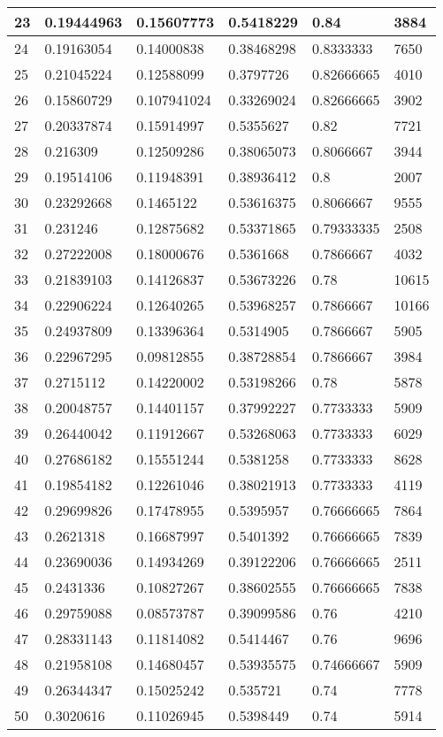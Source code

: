 \begin{longtable}{|l|l|l|l|l|l|}
23 & 0.19444963 & 0.15607773 & 0.5418229 & 0.84 & 3884 \\ \hline 
24 & 0.19163054 & 0.14000838 & 0.38468298 & 0.8333333 & 7650 \\ \hline 
25 & 0.21045224 & 0.12588099 & 0.3797726 & 0.82666665 & 4010 \\ \hline 
26 & 0.15860729 & 0.107941024 & 0.33269024 & 0.82666665 & 3902 \\ \hline 
27 & 0.20337874 & 0.15914997 & 0.5355627 & 0.82 & 7721 \\ \hline 
28 & 0.216309 & 0.12509286 & 0.38065073 & 0.8066667 & 3944 \\ \hline 
29 & 0.19514106 & 0.11948391 & 0.38936412 & 0.8 & 2007 \\ \hline 
30 & 0.23292668 & 0.1465122 & 0.53616375 & 0.8066667 & 9555 \\ \hline 
31 & 0.231246 & 0.12875682 & 0.53371865 & 0.79333335 & 2508 \\ \hline 
32 & 0.27222008 & 0.18000676 & 0.5361668 & 0.7866667 & 4032 \\ \hline 
33 & 0.21839103 & 0.14126837 & 0.53673226 & 0.78 & 10615 \\ \hline 
34 & 0.22906224 & 0.12640265 & 0.53968257 & 0.7866667 & 10166 \\ \hline 
35 & 0.24937809 & 0.13396364 & 0.5314905 & 0.7866667 & 5905 \\ \hline 
36 & 0.22967295 & 0.09812855 & 0.38728854 & 0.7866667 & 3984 \\ \hline 
37 & 0.2715112 & 0.14220002 & 0.53198266 & 0.78 & 5878 \\ \hline 
38 & 0.20048757 & 0.14401157 & 0.37992227 & 0.7733333 & 5909 \\ \hline 
39 & 0.26440042 & 0.11912667 & 0.53268063 & 0.7733333 & 6029 \\ \hline 
40 & 0.27686182 & 0.15551244 & 0.5381258 & 0.7733333 & 8628 \\ \hline 
41 & 0.19854182 & 0.12261046 & 0.38021913 & 0.7733333 & 4119 \\ \hline 
42 & 0.29699826 & 0.17478955 & 0.5395957 & 0.76666665 & 7864 \\ \hline 
43 & 0.2621318 & 0.16687997 & 0.5401392 & 0.76666665 & 7839 \\ \hline 
44 & 0.23690036 & 0.14934269 & 0.39122206 & 0.76666665 & 2511 \\ \hline 
45 & 0.2431336 & 0.10827267 & 0.38602555 & 0.76666665 & 7838 \\ \hline 
46 & 0.29759088 & 0.08573787 & 0.39099586 & 0.76 & 4210 \\ \hline 
47 & 0.28331143 & 0.11814082 & 0.5414467 & 0.76 & 9696 \\ \hline 
48 & 0.21958108 & 0.14680457 & 0.53935575 & 0.74666667 & 5909 \\ \hline 
49 & 0.26344347 & 0.15025242 & 0.535721 & 0.74 & 7778 \\ \hline 
50 & 0.3020616 & 0.11026945 & 0.5398449 & 0.74 & 5914 \\ \hline 
\end{longtable}